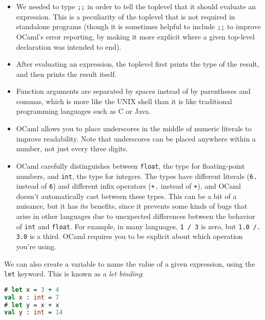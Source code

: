 \begin{itemize}
\item
  We needed to type \passthrough{\lstinline!;;!} in order to tell the
  toplevel that it should evaluate an expression. This is a peculiarity
  of the toplevel that is not required in standalone programs (though it
  is sometimes helpful to include \passthrough{\lstinline!;;!} to
  improve OCaml's error reporting, by making it more explicit where a
  given top-level declaration was intended to end).
\item
  After evaluating an expression, the toplevel first prints the type of
  the result, and then prints the result itself.
\item
  Function arguments are separated by spaces instead of by parentheses
  and commas, which is more like the UNIX shell than it is like
  traditional programming languages such as C or Java.
\item
  OCaml allows you to place underscores in the middle of numeric
  literals to improve readability. Note that underscores can be placed
  anywhere within a number, not just every three digits.
\item
  OCaml carefully distinguishes between \passthrough{\lstinline!float!},
  the type for floating-point numbers, and
  \passthrough{\lstinline!int!}, the type for integers. The types have
  different literals (\passthrough{\lstinline!6.!} instead of
  \passthrough{\lstinline!6!}) and different infix operators
  (\passthrough{\lstinline!+.!} instead of \passthrough{\lstinline!+!}),
  and OCaml doesn't automatically cast between these types. This can be
  a bit of a nuisance, but it has its benefits, since it prevents some
  kinds of bugs that arise in other languages due to unexpected
  differences between the behavior of \passthrough{\lstinline!int!} and
  \passthrough{\lstinline!float!}. For example, in many languages,
  \passthrough{\lstinline!1 / 3!} is zero, but
  \passthrough{\lstinline!1.0 /. 3.0!} is a third. OCaml requires you to
  be explicit about which operation you're using.
\end{itemize}

We can also create a variable to name the value of a given expression,
using the \passthrough{\lstinline!let!} keyword. This is known as a
\emph{let binding}:

\begin{lstlisting}[language=Caml]
# let x = 3 + 4
val x : int = 7
# let y = x + x
val y : int = 14
\end{lstlisting}

